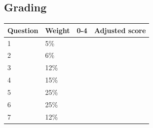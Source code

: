 \documentclass[a4paper,12pt]{book}
\begin{document}
    \hrulefill
    \subsection*{Grading}
            
    \begin{center}
        
        \begin{tabular}{ | l | l | l | l | }
            \hline
            \textbf{ Question } & \textbf{ Weight } & \textbf{ 0-4 } & \textbf{ Adjusted score }
            \\ \hline
            
            1 & 5\% & &    \\ \hline
            
            2 & 6\% & &    \\ \hline
            
            3 & 12\% & &    \\ \hline
            
            4 & 15\% & &    \\ \hline
            
            5 & 25\% & &    \\ \hline
            
            6 & 25\% & &    \\ \hline
            
            7 & 12\% & &    \\ \hline
            
            
            
        \end{tabular}
    \end{center}
\end{document}
